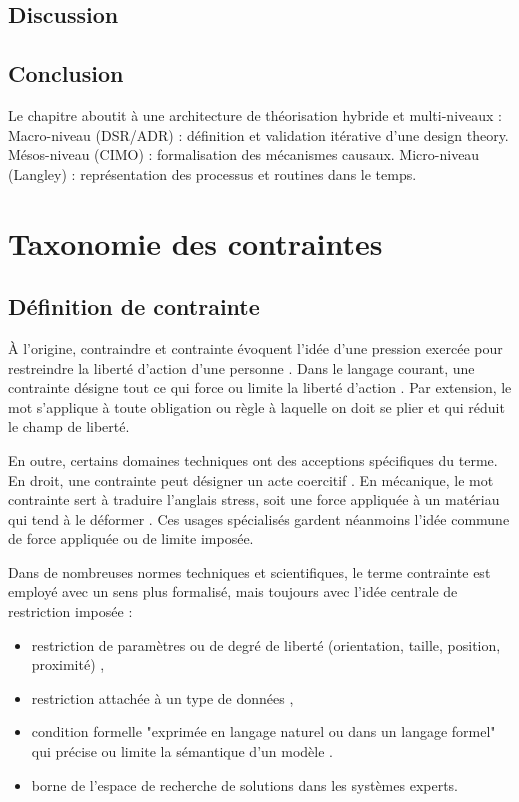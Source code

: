 \documentclass[a4paper,12pt]{article}
\begin{document}
\subsection{Discussion}
\label{sec:orgba81e43}

\subsection{Conclusion}
\label{sec:org29c5173}
Le chapitre aboutit à une architecture de théorisation hybride et multi-niveaux :
Macro-niveau (DSR/ADR) : définition et validation itérative d’une design theory.
Mésos-niveau (CIMO) : formalisation des mécanismes causaux.
Micro-niveau (Langley) : représentation des processus et routines dans le temps.
\clearpage
\section{Taxonomie des contraintes}
\label{sec:org44162b3}
\subsection{Définition de contrainte}
\label{sec:org970da77}
À l’origine, contraindre et contrainte évoquent l’idée d’une pression exercée pour restreindre la liberté d’action d’une personne \autocite{CONTRAINTEEtymologieCONTRAINTE}. Dans le langage courant, une contrainte désigne tout ce qui force ou limite la liberté d’action \autocite{DefinitionContrainte}. Par extension, le mot s’applique à toute obligation ou règle à laquelle on doit se plier et qui réduit le champ de liberté.

En outre, certains domaines techniques ont des acceptions spécifiques du terme. En droit, une contrainte peut désigner un acte coercitif \autocite{DefinitionContrainte}. En mécanique, le mot contrainte sert à traduire l’anglais stress, soit une force appliquée à un matériau qui tend à le déformer \autocite{francaiseContrainteDictionnaireLAcademie}. Ces usages spécialisés gardent néanmoins l’idée commune de force appliquée ou de limite imposée.

Dans de nombreuses normes techniques et scientifiques, le terme contrainte est employé avec un sens plus formalisé, mais toujours avec l’idée centrale de restriction imposée : 
\begin{itemize}
\item restriction de paramètres ou de degré de liberté (orientation, taille, position, proximité) \autocite{SpecificationGeometriqueProduits2023},
\item restriction attachée à un type de données \autocite{TechnologiesLinformationVocabulaire2015},
\item condition formelle "exprimée en langage naturel ou dans un langage formel" qui précise ou limite la sémantique d’un modèle  \autocite{NFISO191032024}.
\item borne de l’espace de recherche de solutions \autocite{TechnologiesLinformationVocabulaire2015} dans les systèmes experts.
\end{itemize}
\end{document}

